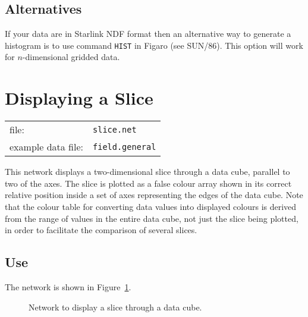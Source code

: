 \documentclass[twoside,11pt]{article}
\newcommand{\xref}[3]{#1}
\newcommand{\xlabel}[1]{}
\begin{document}
\subsection{Alternatives}

If your data are in Starlink NDF format then an alternative way to
generate a histogram is to use command \xref{{\tt HIST}}{sun86}{HIST} in
Figaro (see \xref{SUN/86}{sun86}{}\cite{SUN86}).  This option will work
for $n$-dimensional gridded data.


\newpage
\section{\xlabel{SLICNET}\label{SLICNET}Displaying a Slice}


\begin{tabular}{ll}
file:              & {\tt slice.net}     \\
example data file: & {\tt field.general} \\
\end{tabular}

This network displays a two-dimensional slice through a data cube,
parallel to two of the axes. The slice is plotted as a false colour
array shown in its correct relative position inside a set of axes
representing the edges of the data cube. Note that the colour table for
converting data values into displayed colours is derived from the range
of values in the entire data cube, not just the slice being plotted,
in order to facilitate the comparison of several slices.

\subsection{Use}

The network is shown in Figure~\ref{SLICNETF}.

\begin{figure}[htbp]

\begin{center}
\leavevmode
\epsfxsize=553pt
\end{center}

\caption[Network to display a slice through a data cube.]{Network to
display a slice through a data cube. \label{SLICNETF} }

\end{figure}
\end{document}
